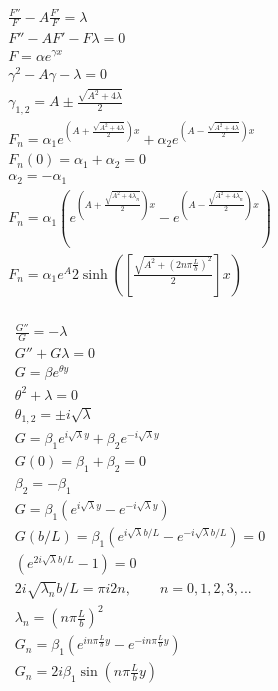 \documentclass[11pt]{article}
\begin{document}
\noindent\begin{minipage}[b]{.5\linewidth}\centering
\begin{equation}\begin{aligned}
\frac{F''}{F} - A \frac{F'}{F} = \lambda \\
F'' - A F' - F \lambda = 0 \\
F = \alpha e^{\gamma x} \\
\gamma^2 - A \gamma - \lambda = 0 \\
\gamma_{1,2} = A \pm \frac{\sqrt{A^2 + 4\lambda}}{2} \\
F_n = \alpha_1 e^{\left(A + \frac{\sqrt{A^2 + 4\lambda}}{2}\right) x} + \alpha_2 e^{\left(A - \frac{\sqrt{A^2 + 4\lambda}}{2} \right) x} \\
F_n(0) = \alpha_1 + \alpha_2  = 0 \\
\alpha_2 = - \alpha_1 \\
F_n = \alpha_1 \left( e^{\left(A + \frac{\sqrt{A^2 + 4\lambda_n}}{2}\right) x} - e^{\left(A - \frac{\sqrt{A^2 + 4\lambda_n}}{2} \right) x} \right) \\
F_n = \alpha_1 e^{A} 2 \sinh \left( \left[\frac{\sqrt{A^2 + \left(2 n \pi \frac{L}{b} \right)^2}}{2}\right] x \right) \\
\end{aligned} \end{equation}
\end{minipage}
\noindent\begin{minipage}[b]{.5\linewidth}\centering
\begin{equation}\begin{aligned}
\frac{G''}{G} = - \lambda \\
G'' + G \lambda = 0 \\
G = \beta e^{\theta y} \\
\theta^2 + \lambda = 0 \\
\theta_{1,2} = \pm i \sqrt{\lambda} \\
G = \beta_1 e^{i \sqrt{\lambda} y} + \beta_2 e^{-i \sqrt{\lambda} y} \\
G(0) = \beta_1 + \beta_2 = 0 \\
\beta_2 = - \beta_1 \\
G = \beta_1 \left( e^{i \sqrt{\lambda} y} - e^{-i \sqrt{\lambda} y} \right) \\
G(b/L) = \beta_1 \left( e^{i \sqrt{\lambda} b/L} - e^{-i \sqrt{\lambda} b/L} \right) = 0 \\
                 \left( e^{2 i \sqrt{\lambda} b/L} - 1 \right) = 0 \\
2 i \sqrt{\lambda_n} b/L = \pi i 2n, \qquad n = 0,1,2,3,... \\
\lambda_n = \left( n \pi \frac{L}{b} \right)^2 \\
G_n = \beta_1 \left( e^{i n \pi \frac{L}{b} y} - e^{-i n \pi \frac{L}{b} y} \right) \\
G_n = 2i \beta_1 \sin \left(n \pi \frac{L}{b} y \right) \\
\end{aligned} \end{equation}
\end{minipage}
\end{document}
